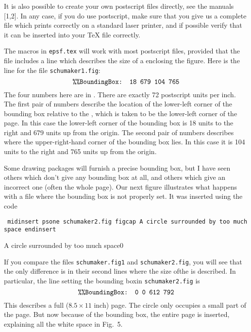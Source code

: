 \noin
It is also possible to create your own postscript files directly,
see the manuals [1,2]. In any case, if you do use postscript,
make sure that you give us a complete file which prints correctly
on a standard laser printer, and if possible verify that it can
be inserted into your \TeX{} file correctly.

The macros in {\tt epsf.tex}  will work with most postscript files,
provided that the file includes
a line which describes the size of a  enclosing
the figure. Here is the line for the file {\tt schumaker1.fig}:
\medskip
$$\hbox{\tt \%\%BoundingBox: 18 679 104 765} $$
\medskip
\noindent The four numbers here are in .
	There are
exactly 72 postscript units per inch.  The first pair of numbers describe
the location of the lower-left corner of the bounding box relative
to the , which is taken to be the
lower-left corner of the page.	In this case the lower-left corner of the
bounding box is 18 units
to the right and 679 units up from the origin.
The second pair of numbers describes
where the upper-right-hand corner of the bounding box lies.  In this case
it is 104 units to the right and 765 units up from the origin.

Some drawing packages will furnish a precise bounding box, but I have seen
others which don't give any bounding box at all, and others which
give an incorrect one (often the whole page).
Our next figure illustrates what happens with a file where the bounding
box is not properly set. It
 was inserted using the code
\medskip

{\obeylines \tt
\back midinsert
\back psone \lc schumaker2.fig\rc {}\rc
\back figcap \rc \lc A circle surrounded by too much space\rc{}\rc
\back endinsert
}
\medskip

\midinsert
{}
 {A circle surrounded by too much space}{0}
\endinsert

If you compare the files {\tt schumaker.fig1} and {\tt schumaker2.fig}, you
will see that the only difference is in their second lines where the size
of\break the  is described. In particular,
the line setting the bounding box\break in  {\tt schumaker2.fig} is
$$\hbox{\tt \%\%BoundingBox: 0 0 612 792} $$
\noindent This describes a full ($8.5 \times 11$ inch) page. The
circle only occupies a small part of the page.	But now because of
the bounding box, the entire page is inserted, explaining all the white
space in Fig.~5.

